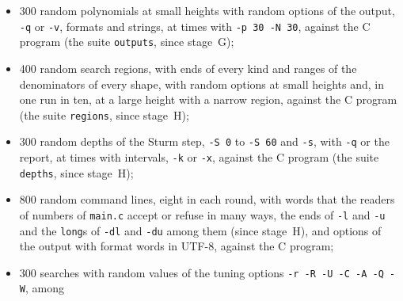 \begin{itemize}
    bounds of a \verb|long|, the grammar of \verb|strtod|, every option with a missing or malformed
    argument, the options of the search, the search region (errors~7 and~6 of \verb|-l -u -dl -du|,
    the join, the test of the callback, the suppression of the reversal and the order with a range
    of the denominators, since stage~H), the options of the output, the formats and the strings of
    \verb|-f -fs -fm -fe|, the report, the refusals of forms that are not squarefree with and
    without \verb|-s| and \verb|-k|, the order of the checks, and, since stage~I, the report of the
    library under \verb|-v| with its exits, the refusals after its first lines, the three cases of
    the reversal, the divisors, the forbidden divisors and the tuning options; the two searches at
    the height $10^{12}$ that both programs stop at a point at infinity, \verb|'1 0 1'| and
    \verb|'3 2 -1 12'| with \verb|-q -1|, run with a timeout of $30$ seconds and a cap of $4$~GB on
    the memory; besides these, the usage of \verb|ratpoints-lean|, and failed writes: a standard
    output that is a pipe without a reader, where \verb|SIGPIPE| must end the C program and
    \verb|ratpoints-lean| must exit with status~141, both without a message (unless nothing is
    written), and a full device, where both must ignore the failure;
  \item 300 random polynomials at small heights with random options of the output, \verb|-q| or
    \verb|-v|, formats and strings, at times with \verb|-p 30 -N 30|, against the C program (the
    suite \verb|outputs|, since stage~G);
  \item 400 random search regions, with ends of every kind and ranges of the denominators of every
    shape, with random options at small heights and, in one run in ten, at a large height with a
    narrow region, against the C program (the suite \verb|regions|, since stage~H);
  \item 300 random depths of the Sturm step, \verb|-S 0| to \verb|-S 60| and \verb|-s|, with
    \verb|-q| or the report, at times with intervals, \verb|-k| or \verb|-x|, against the C program
    (the suite \verb|depths|, since stage~H);
  \item 800 random command lines, eight in each round, with words that the readers of numbers of
    \verb|main.c| accept or refuse in many ways, the ends of \verb|-l| and \verb|-u| and the
    \verb|long|s of \verb|-dl| and \verb|-du| among them (since stage~H), and options of the output
    with format words in UTF-8, against the C program;
  \item 300 searches with random values of the tuning options \verb|-r -R -U -C -A -Q -W|, among

\end{itemize}
